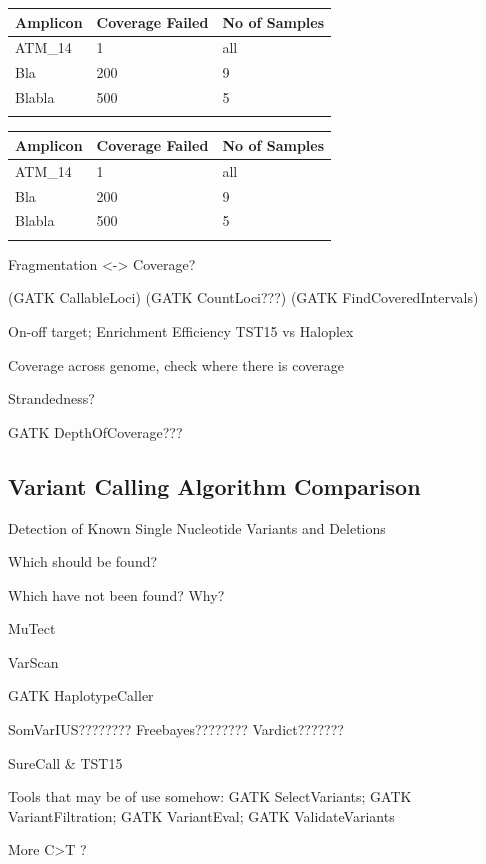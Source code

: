 \begin{minipage}{0.5\textwidth}
\begin{tabular}{p{1.5cm} p{1.5cm} p{1.5cm}}\\
\hline
Amplicon & Coverage Failed & No of Samples \\
\hline
ATM_14 & 1 & all \\
Bla & 200 & 9 \\
Blabla & 500 & 5 \\
\label{failed_hpx}
\end{tabular}
\end{minipage}
\hfill
\begin{minipage}{0.5\textwidth}
\begin{tabular}{p{3cm} p{1.5cm} p{1.5cm}}\\
\hline
Amplicon & Coverage Failed & No of Samples \\
\hline
ATM_14 & 1 & all \\
Bla & 200 & 9 \\
Blabla & 500 & 5 \\
\label{failed_tst}
\end{tabular}
\end{minipage}

Fragmentation <-> Coverage?

(GATK CallableLoci)
(GATK CountLoci???)
(GATK FindCoveredIntervals)

On-off target; Enrichment Efficiency TST15 vs Haloplex

Coverage across genome, check where there is coverage

Strandedness?

GATK DepthOfCoverage???

\subsection{Variant Calling Algorithm Comparison}
Detection of Known Single Nucleotide Variants and Deletions

Which should be found?

Which have not been found? Why?

MuTect

VarScan

GATK HaplotypeCaller

SomVarIUS????????
Freebayes????????
Vardict???????

SureCall & TST15

Tools that may be of use somehow: GATK SelectVariants; GATK VariantFiltration; GATK VariantEval; GATK ValidateVariants

More C>T ?
